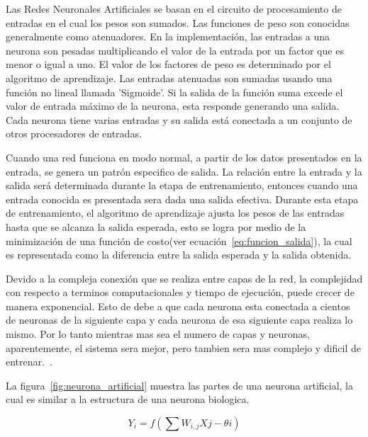 Las Redes Neuronales Artificiales se basan en el circuito de procesamiento de entradas en el cual los pesos son sumados. Las funciones de peso son conocidas generalmente como atenuadores. En la implementación, las entradas a una neurona son pesadas multiplicando el valor de la entrada por un factor que es menor o igual a uno. El valor de los factores de peso es determinado por el algoritmo de aprendizaje. Las entradas atenuadas son sumadas usando una función no lineal llamada 'Sigmoide'. Si la salida de la función suma excede el valor de entrada máximo de la neurona, esta responde generando una salida. Cada neurona tiene varias entradas y su salida está conectada a un conjunto de otros procesadores de entradas.

Cuando una red funciona en modo normal, a partir de los datos presentados en la entrada, se genera un patrón especifico de salida. La relación entre la entrada y la salida será determinada durante la etapa de  entrenamiento, entonces cuando una entrada conocida es presentada sera dada una salida efectiva. Durante esta etapa de entrenamiento, el algoritmo de aprendizaje ajusta los pesos de las entradas hasta que se alcanza la salida esperada, esto se logra por medio de la minimización de una función de costo(ver ecuación~\ref{eq:funcion_salida}), la cual es representada como la diferencia entre la salida esperada y la salida obtenida.

Devido a la compleja conexión que se realiza entre capas de la red, la complejidad con respecto a terminos computacionales y tiempo de ejecución, puede crecer de manera exponencial. Esto de debe a que cada neurona esta conectada a cientos de neuronas de la siguiente capa y cada neurona de esa siguiente capa realiza lo mismo. Por lo tanto mientras mas sea el numero de capas y neuronas, aparentemente, el sistema sera mejor, pero tambien sera mas complejo y dificil de entrenar.~\cite{21RedesNeuronales}.

La figura~\ref{fig:neurona_artificial} muestra las partes de una neurona artificial, la cual es similar a la estructura de una neurona biologica.

\begin{equation}\label{eq:funcion_salida}
Y_{i} = f(\sum W_{i,j}X{j} - \theta{i})
\end{equation}

